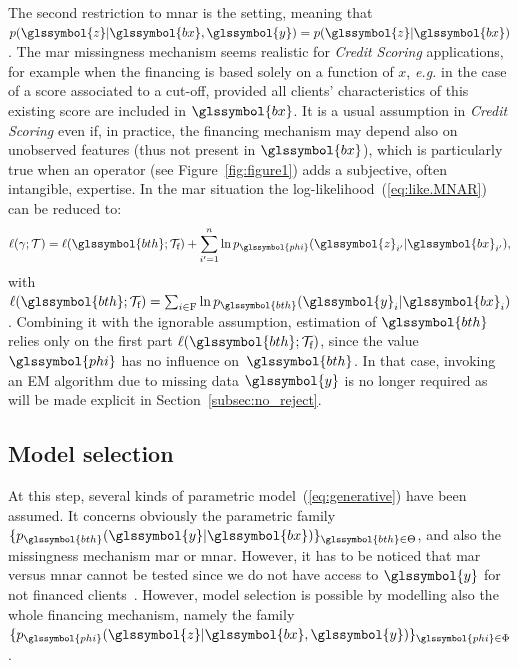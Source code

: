 The second restriction to \gls{mnar} is the  setting, meaning that $p(\glssymbol{z}| \glssymbol{bx},\glssymbol{y}) = p(\glssymbol{z}|\glssymbol{bx})$. The \gls{mar} missingness mechanism seems realistic for \textit{Credit Scoring} applications, for example when the financing is based solely on a function of $x$, {\it e.g.} in the case of a score associated to a cut-off, provided all clients' characteristics of this existing \gls{score} are included in $\glssymbol{bx}$. It is a usual assumption in \textit{Credit Scoring} even if, in practice, the financing mechanism may depend also on unobserved features (thus not present in $\glssymbol{bx}$), which is particularly true when an operator (see Figure~\ref{fig:figure1}) adds a subjective, often intangible, expertise. In the \gls{mar} situation the log-likelihood~(\ref{eq:like.MNAR}) can be reduced to:
\begin{equation}\label{eq:like.MAR}
\ell(\gamma;\mathcal{T}) = \ell(\glssymbol{bth};\mathcal{T}_{\text{f}}) + \sum_{i'=1}^n \ln p_{\glssymbol{phi}}(\glssymbol{z}_{i'} | \glssymbol{bx}_{i'}),
\end{equation}
with $\ell(\glssymbol{bth};\mathcal{T}_{\text{f}})=\sum_{i\in\text{F}}\ln p_{\glssymbol{bth}}(\glssymbol{y}_i | \glssymbol{bx}_i)$.
Combining it with the ignorable assumption, estimation of $\glssymbol{bth}$ relies only on the first part $\ell(\glssymbol{bth};\mathcal{T}_{\text{f}})$, since the value $\glssymbol{phi}$ has no influence on~$\glssymbol{bth}$. In that case, invoking an EM algorithm due to missing data $\glssymbol{y}$ is no longer required as will be made explicit in Section~\ref{subsec:no_reject}.

\subsection{Model selection}

At this step, several kinds of parametric model~(\ref{eq:generative}) have been assumed. It concerns obviously the parametric family $\{p_{\glssymbol{bth}}(\glssymbol{y}|\glssymbol{bx})\}_{\glssymbol{bth} \in\Theta}$, and also the missingness mechanism \gls{mar} or \gls{mnar}. 
However, it has to be noticed that \gls{mar} versus \gls{mnar} cannot be tested since we do not have access to $\glssymbol{y}$ for not financed clients~\cite{molenberghs2008every}. However, model selection is possible by modelling also the whole financing mechanism, namely the family $\{p_{\glssymbol{phi}}(\glssymbol{z}|\glssymbol{bx},\glssymbol{y})\}_{\glssymbol{phi} \in \Phi}$.


